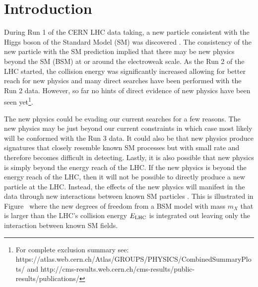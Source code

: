 \section{Introduction}

During Run 1 of the CERN LHC data taking, a new particle consistent with the Higgs boson of the Standard Model (SM) was discovered \cite{Aad:2012tfa,Chatrchyan:2012ufa}.
The consistency of the new particle with the SM prediction implied that there may be new physics beyond the SM (BSM) at or around the electroweak scale.
As the Run 2 of the LHC started, the collision energy was significantly increased allowing for better reach for new physics and many direct searches have been performed with the Run 2 data.
However, so far no hints of direct evidence of new physics have been seen yet\footnote{For complete exclusion summary see: https://atlas.web.cern.ch/Atlas/GROUPS/PHYSICS/CombinedSummaryPlots/ and http://cms-results.web.cern.ch/cms-results/public-results/publications/}.

The new physics could be evading our current searches for a few reasons.
The new physics may be just beyond our current constraints in which case most likely will be conformed with the Run 3 data.
It could also be that new physics produce signatures that closely resemble known SM processes but with small rate and therefore becomes difficult in detecting.
Lastly, it is also possible that new physics is simply beyond the energy reach of the LHC.
If the new physics is beyond the energy reach of the LHC, then it will not be possible to directly produce a new particle at the LHC.
Instead, the effects of the new physics will manifest in the data through new interactions between known SM particles \cite{Weinberg:1978kz,Weinberg:1979sa,Buchmuller:1985jz}.
This is illustrated in Figure~ where the new degrees of freedom from a BSM model with mass $m_{X}$ that is larger than the LHC's collision energy $E_{\tiny\textrm{LHC}}$ is integrated out leaving only the interaction between known SM fields.

